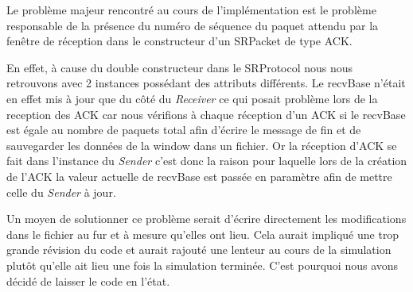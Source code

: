 \documentclass[../rapport.tex]{subfiles}
\begin{document}
Le problème majeur rencontré au cours de l'implémentation est le problème responsable de la 
présence du numéro de séquence du paquet attendu par la fenêtre de réception dans le constructeur
d'un SRPacket de type ACK. 

\medskip

En effet, à cause du double constructeur dans le SRProtocol nous nous retrouvons avec 2 instances
possédant des attributs différents. Le recvBase n'était en effet mis à jour que du côté du
\textit{Receiver} ce qui posait problème lors de la reception des ACK car nous vérifions
à chaque réception d'un ACK si le recvBase est égale au nombre de paquets total afin d'écrire
le message de fin et de sauvegarder les données de la window dans un fichier. Or la réception
d'ACK se fait dans l'instance du \textit{Sender} c'est donc la raison pour laquelle lors de la 
création de l'ACK la valeur actuelle de recvBase est passée en paramètre afin de mettre celle
du \textit{Sender} à jour. 

\medskip

Un moyen de solutionner ce problème serait d'écrire directement les modifications dans le 
fichier au fur et à mesure qu'elles ont lieu. Cela aurait impliqué une trop grande révision du
code et aurait rajouté une lenteur au cours de la simulation plutôt qu'elle ait lieu une fois la 
simulation terminée. C'est pourquoi nous avons décidé de laisser le code en l'état. 
\end{document}
